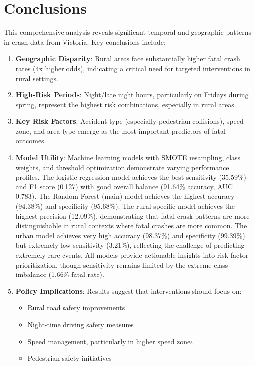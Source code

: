 \documentclass[12pt,a4paper]{article}
\begin{document}
\section{Conclusions}

This comprehensive analysis reveals significant temporal and geographic patterns in crash data from Victoria. Key conclusions include:

\begin{enumerate}
    \item \textbf{Geographic Disparity}: Rural areas face substantially higher fatal crash rates (4x higher odds), indicating a critical need for targeted interventions in rural settings.
    
    \item \textbf{High-Risk Periods}: Night/late night hours, particularly on Fridays during spring, represent the highest risk combinations, especially in rural areas.
    
    \item \textbf{Key Risk Factors}: Accident type (especially pedestrian collisions), speed zone, and area type emerge as the most important predictors of fatal outcomes.
    
    \item \textbf{Model Utility}: Machine learning models with SMOTE resampling, class weights, and threshold optimization demonstrate varying performance profiles. The logistic regression model achieves the best sensitivity (35.59\%) and F1 score (0.127) with good overall balance (91.64\% accuracy, AUC = 0.783). The Random Forest (main) model achieves the highest accuracy (94.38\%) and specificity (95.68\%). The rural-specific model achieves the highest precision (12.09\%), demonstrating that fatal crash patterns are more distinguishable in rural contexts where fatal crashes are more common. The urban model achieves very high accuracy (98.37\%) and specificity (99.39\%) but extremely low sensitivity (3.21\%), reflecting the challenge of predicting extremely rare events. All models provide actionable insights into risk factor prioritization, though sensitivity remains limited by the extreme class imbalance (1.66\% fatal rate).
    
    \item \textbf{Policy Implications}: Results suggest that interventions should focus on:
    \begin{itemize}
        \item Rural road safety improvements
        \item Night-time driving safety measures
        \item Speed management, particularly in higher speed zones
        \item Pedestrian safety initiatives
    \end{itemize}
\end{enumerate}
\end{document}
